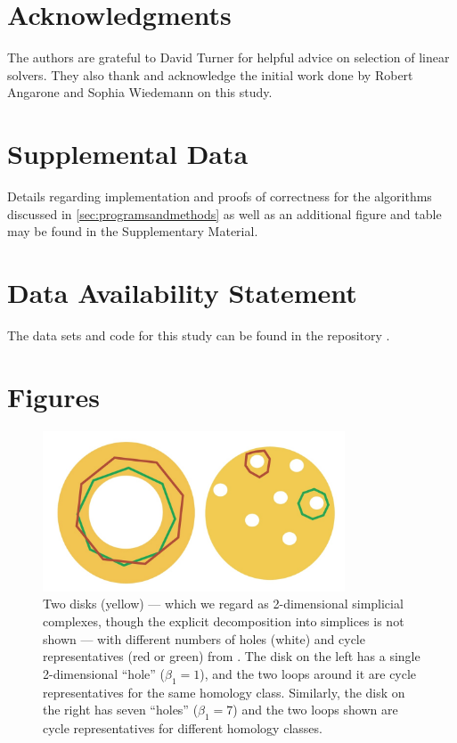 \section{Acknowledgments} 
The authors are grateful to David Turner for helpful advice on selection of linear solvers. They also thank and acknowledge the initial work done by Robert Angarone and Sophia Wiedemann on this study.


\section{Supplemental Data}

Details regarding implementation and proofs of correctness for the algorithms discussed in \se \ref{sec:programsandmethods} as well as an additional figure and table may be found in the Supplementary Material.
 

\section{Data Availability Statement}
The data sets and code for this study can be found in the repository \cite{li_thompson}.

  


 
\section{Figures}
\label{figures} 

\begin{figure}[!h]
    \centering
    \includegraphics[width=0.8\textwidth]{figures/generatorExample.jpg}
    \caption{Two disks (yellow) --- which we regard as 2-dimensional simplicial complexes, though the explicit decomposition into simplices is not shown --- with different numbers of holes (white) and cycle representatives (red or green) from \cite{Carlsson2009TopologyAD}. The disk on the left has a single 2-dimensional  ``hole'' ($\beta_1 = 1$), and the two loops around it are cycle representatives for the same homology class. Similarly, the disk on the right has seven ``holes'' ($\beta_1 = 7$) and the two loops shown are cycle representatives for different homology classes.
    }
    \label{fig:generatorExamples}
\end{figure}

